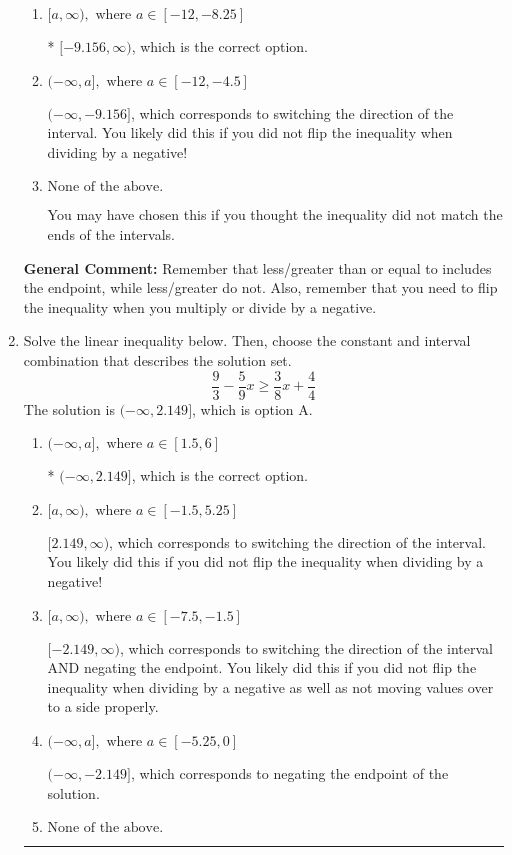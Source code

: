 \documentclass{extbook}[14pt]
\newcommand{\litem}[1]{\item #1

\rule{\textwidth}{0.4pt}}
\begin{document}
\begin{enumerate}
{\begin{enumerate}[label=\Alph*.]
 $[9.156, \infty)$, which corresponds to negating the endpoint of the solution.
\item \( [a, \infty), \text{ where } a \in [-12, -8.25] \)

* $[-9.156, \infty)$, which is the correct option.
\item \( (-\infty, a], \text{ where } a \in [-12, -4.5] \)

 $(-\infty, -9.156]$, which corresponds to switching the direction of the interval. You likely did this if you did not flip the inequality when dividing by a negative!
\item \( \text{None of the above}. \)

You may have chosen this if you thought the inequality did not match the ends of the intervals.
\end{enumerate}

\textbf{General Comment:} Remember that less/greater than or equal to includes the endpoint, while less/greater do not. Also, remember that you need to flip the inequality when you multiply or divide by a negative.
}
\litem{
Solve the linear inequality below. Then, choose the constant and interval combination that describes the solution set.
\[ \frac{9}{3} - \frac{5}{9} x \geq \frac{3}{8} x + \frac{4}{4} \]The solution is \( (-\infty, 2.149] \), which is option A.\begin{enumerate}[label=\Alph*.]
\item \( (-\infty, a], \text{ where } a \in [1.5, 6] \)

* $(-\infty, 2.149]$, which is the correct option.
\item \( [a, \infty), \text{ where } a \in [-1.5, 5.25] \)

 $[2.149, \infty)$, which corresponds to switching the direction of the interval. You likely did this if you did not flip the inequality when dividing by a negative!
\item \( [a, \infty), \text{ where } a \in [-7.5, -1.5] \)

 $[-2.149, \infty)$, which corresponds to switching the direction of the interval AND negating the endpoint. You likely did this if you did not flip the inequality when dividing by a negative as well as not moving values over to a side properly.
\item \( (-\infty, a], \text{ where } a \in [-5.25, 0] \)

 $(-\infty, -2.149]$, which corresponds to negating the endpoint of the solution.
\item \( \text{None of the above}. \)


\end{enumerate}}
\end{enumerate}
\end{document}
